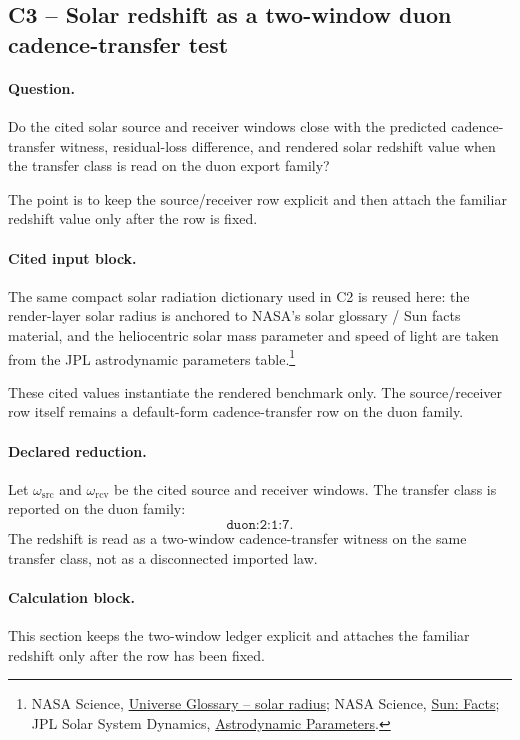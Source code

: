 \subsection{C3 -- Solar redshift as a two-window duon cadence-transfer test}\label{app:c3}
\paragraph{Question.} Do the cited solar source and receiver windows close with the predicted cadence-transfer witness, residual-loss difference, and rendered solar redshift value when the transfer class is read on the duon export family?

The point is to keep the source/receiver row explicit and then attach the familiar redshift value only after the row is fixed.

\paragraph{Cited input block.} The same compact solar radiation dictionary used in C2 is reused here: the render-layer solar radius is anchored to NASA's solar glossary / Sun facts material, and the heliocentric solar mass parameter and speed of light are taken from the JPL astrodynamic parameters table.\footnote{NASA Science, \href{https://science.nasa.gov/universe/glossary/}{Universe Glossary -- solar radius}; NASA Science, \href{https://science.nasa.gov/sun/facts/}{Sun: Facts}; JPL Solar System Dynamics, \href{https://ssd.jpl.nasa.gov/astro_par.html}{Astrodynamic Parameters}.}

These cited values instantiate the rendered benchmark only. The source/receiver row itself remains a default-form cadence-transfer row on the duon family.

\paragraph{Declared reduction.} Let $\omega_{\mathrm{src}}$ and $\omega_{\mathrm{rcv}}$ be the cited source and receiver windows. The transfer class is reported on the duon family:
\[
\texttt{duon:2:1:7}.
\]
The redshift is read as a two-window cadence-transfer witness on the same transfer class, not as a disconnected imported law.

\paragraph{Calculation block.} This section keeps the two-window ledger explicit and attaches the familiar redshift only after the row has been fixed.


